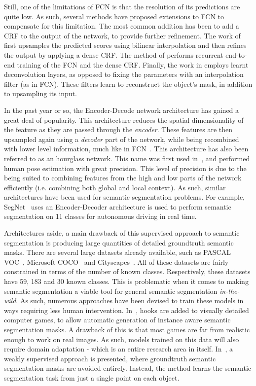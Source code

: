 Still, one of the limitations of FCN is that the resolution of its
predictions are quite low. As such, several methods have proposed
extensions to FCN to compensate for this limitation. The most common
addition has been to add a CRF to the output of the network, to
provide further refinement. The work of \cite{chen2015semantic}
first upsamples the predicted scores using bilinear interpolation
and then refines the output by applying a dense CRF. The method of
\cite{zheng2015conditional} performs recurrent end-to-end training of
the FCN and the dense CRF. Finally, the work in \cite{noh2015learning}
employs learnt deconvolution layers, as opposed to fixing the
parameters with an interpolation filter (as in FCN). These filters
learn to reconstruct the object's mask, in addition to upsampling its
input.

In the past year or so, the Encoder-Decode network architecture has
gained a great deal of popularity. This architecture reduces the
spatial dimensionality of the feature as they are passed through the
\textit{encoder}. These features are then upsampled again using a
\textit{decoder} part of the network, while being recombined with
lower level information, much like in FCN~\cite{long2015fully}. This
architecture has also been referred to as an hourglass network. This
name was first used in~\cite{newell2016stacked}, and performed human
pose estimation with great precision. This level of precision is due
to the being suited to combining features from the high and low parts
of the network efficiently (i.e. combining both global and local
context). As such, similar architectures have been used for semantic
segmentation problems. For example,
SegNet~\cite{badrinarayanan2017segnet} uses an Encoder-Decoder
architecture is used to perform semantic segmentation on 11 classes
for autonomous driving in real time.

Architectures aside, a main drawback of this supervised approach to
semantic segmentation is producing large quantities of detailed
groundtruth semantic masks. There are several large datasets already
available, such as PASCAL VOC~\cite{everingham2010pascal}, Microsoft
COCO~\cite{lin2014microsoft} and
Cityscapes~\cite{cordts2016cityscapes}. All of these datasets are
fairly constrained in terms of the number of known
classes. Respectively, these datasets have 59, 183 and 30 known
classes. This is problematic when it comes to making semantic
segmentation a viable tool for general semantic segmentation
\textit{in-the-wild}. As such, numerous approaches have been devised
to train these models in ways requiring less human
intervention. In~\cite{richter2016playing}, hooks are added to
visually detailed computer games, to allow automatic generation of
instance aware semantic segmentation masks. A drawback of this is that
most games are far from realistic enough to work on real images. As
such, models trained on this data will also require domain adaptation
- which is an entire research area in itself. In~\cite{bearman2016s},
a weakly supervised approach is presented, where groundtruth semantic
segmentation masks are avoided entirely. Instead, the method learns
the semantic segmentation task from just a single point on each
object.

